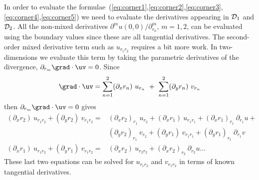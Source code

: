 \documentclass[12pt]{article}
\begin{document}
In order to evaluate the formulae~(\ref{eq:corner1},\ref{eq:corner2},\ref{eq:corner3},
\ref{eq:corner4},\ref{eq:corner5}) we need to evaluate the derivatives appearing in 
${\mathcal D}_1$ and ${\mathcal D}_2$. All the non-mixed derivatives $\partial^m u(0,0)/\partial_{r_n}^m$, $m=1,2$,
can be evaluated using the boundary values since these are all tangential derivatives. 
The second-order mixed derivative term such as $u_{r_1 r_2}$
requires a bit more work. In two-dimensions we evaluate this term by taking the parametric
derivatives of the divergence, $\partial_{r_m} \grad\cdot\uv=0$.
Since
\[
    \grad\cdot\uv = \sum_{n=1}^2 (\partial_x r_n)~ u_{r_n} ~+~  \sum_{n=1}^2 (\partial_y r_n)~v_{r_n}
\]
then $\partial_{r_m} \grad\cdot\uv=0$ gives
\begin{align*}
    (\partial_x r_2) ~ u_{r_1 r_2} + (\partial_y r_2) ~v_{r_1 r_2} =& 
      (\partial_x r_2)_{r_1} ~ u_{r_2} +
      (\partial_x r_1) ~u_{r_1 r_1} + (\partial_x r_1)_{r_1}~\partial_{r_1} u + \\
     & (\partial_y r_2)_{r_1} ~ v_{r_2} +(\partial_y r_1) ~v_{r_1 r_1} + (\partial_y r_1)_{r_1}~\partial_{r_1} v \\
    (\partial_x r_1) ~u_{r_1 r_2}  + (\partial_y r_1) ~v_{r_1 r_2} =& 
        (\partial_x r_2) ~u_{r_2 r_2} + (\partial_x r_2)_{r_2}~\partial_{r_2} u       ... 
\end{align*}
These last two equations can be solved for $u_{r_1 r_2}$ and $v_{r_1 r_2}$
in terms of known tangential derivatives.
\end{document}
